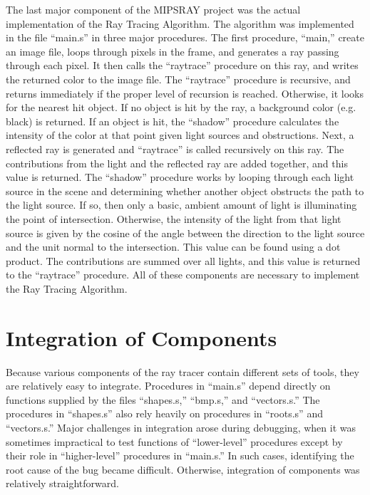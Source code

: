 \documentclass[10pt]{article}
\begin{document}
The last major component of the MIPSRAY project was the actual
implementation of the Ray Tracing Algorithm. The algorithm was
implemented in the file ``main.s'' in three major procedures. The
first procedure, ``main,'' create an image file, loops through pixels
in the frame, and generates a ray passing through each pixel. It then
calls the ``raytrace'' procedure on this ray, and writes the returned
color to the image file. The ``raytrace'' procedure is recursive,
and returns immediately if the proper level of recursion is reached.
Otherwise, it looks for the nearest hit object. If no object is hit by
the ray, a background color (e.g. black) is returned. If an object is
hit, the ``shadow'' procedure calculates the intensity of the color at
that point given light sources and obstructions. Next, a reflected ray
is generated and ``raytrace'' is called recursively on this ray. The
contributions from the light and the reflected ray are added together,
and this value is returned. The ``shadow'' procedure works by looping
through each light source in the scene and determining whether another
object obstructs the path to the light source. If so, then only a basic,
ambient amount of light is illuminating the point of intersection.
Otherwise, the intensity of the light from that light source is given by
the cosine of the angle between the direction to the light source and
the unit normal to the intersection. This value can be found using a dot
product. The contributions are summed over all lights, and this value
is returned to the ``raytrace'' procedure. All of these components are
necessary to implement the Ray Tracing Algorithm.

\section{Integration of Components}

Because various components of the ray tracer contain different sets of tools, they are relatively easy to integrate.  Procedures in ``main.s'' depend directly on functions supplied by the files ``shapes.s,'' ``bmp.s,'' and ``vectors.s.''  The procedures in ``shapes.s'' also rely heavily on procedures in ``roots.s'' and ``vectors.s.''  Major challenges in integration arose during debugging, when it was sometimes impractical to test functions of ``lower-level'' procedures except by their role in ``higher-level'' procedures in ``main.s.''  In such cases, identifying the root cause of the bug became difficult.  Otherwise, integration of components was relatively straightforward.
\end{document}
